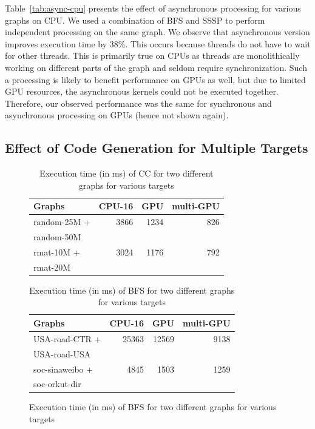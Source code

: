 Table~\ref{tab:async-cpu} presents the effect of asynchronous processing for various graphs on CPU.
We used a combination of BFS and SSSP to perform independent processing on the same graph.
We observe that asynchronous version improves execution time by 38\%. 
This occurs because threads do not have to wait for other threads.
This is primarily true on CPUs as threads are monolithically working on different parts of the graph and seldom require synchronization.
Such a processing is likely to benefit performance on GPUs as well, but due to limited GPU resources, the asynchronous kernels could not be executed together.
Therefore, our observed performance was the same for synchronous and asynchronous processing on GPUs (hence not shown again).

\subsection{Effect of Code Generation for Multiple Targets}\label{expt:cpugpu}

\begin{figure}
\begin{minipage}{0.45\textwidth}
\begin{table}[H]
\centering
\footnotesize
\begin{tabular}{|l|r|r|r|}
\hline
\textbf{Graphs} & \textbf{CPU-16} & \textbf{GPU} & \textbf{multi-GPU}\\\hline
random-25M + & 3866 & 1234 & 826 \\
random-50M		&	&	& \\\hline
rmat-10M + & 3024 & 1176 & 792 \\
rmat-20M	&	&	& \\
\hline
\end{tabular}
\caption{Execution time (in ms) of CC for two different graphs for various targets}
\label{tab:multigpu}
\end{table}
\end{minipage}\hfill
\begin{minipage}{0.45\textwidth}
\begin{table}[H]
\centering
\footnotesize
\begin{tabular}{|l|r|r|r|}
\hline
\textbf{Graphs} & \textbf{CPU-16} & \textbf{GPU} & \textbf{multi-GPU}\\\hline
USA-road-CTR + & 25363 & 12569 & 9138 \\
USA-road-USA	&	&	& \\\hline
soc-sinaweibo + & 4845 & 1503 & 1259 \\
soc-orkut-dir	&	&	& \\
\hline
\end{tabular}
\caption{Execution time (in ms) of BFS for two different graphs for various targets}
\label{tab:multigpumst}
\end{table}
\end{minipage}
\end{figure}

